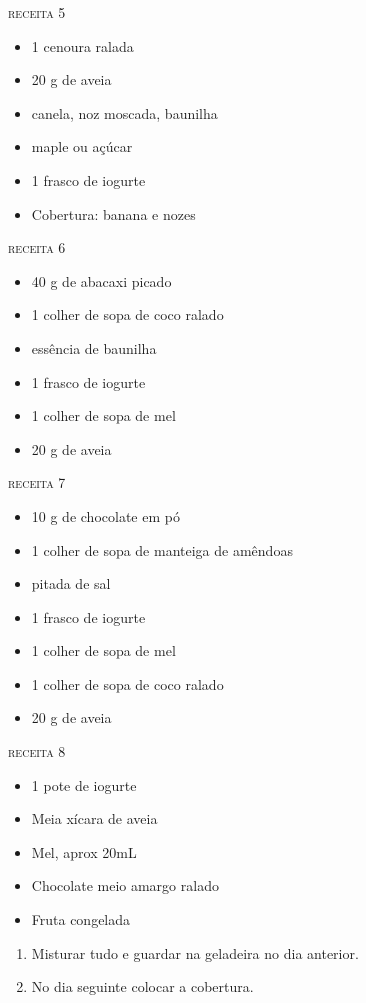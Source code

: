 {\begin{multicols}{2}
		\textsc{receita 5}
		\begin{itemize}
			\item 1 cenoura ralada
			\item 20 g de aveia
			\item canela, noz moscada, baunilha
			\item maple ou açúcar
			\item 1 frasco de iogurte
			\item Cobertura: banana e nozes
		\end{itemize}

		\textsc{receita 6}
		\begin{itemize}
			\item 40 g de abacaxi picado
			\item 1 colher de sopa de coco ralado
			\item essência de baunilha
			\item 1 frasco de iogurte
			\item 1 colher de sopa de mel
			\item 20 g de aveia
		\end{itemize}

		\textsc{receita 7}
		\begin{itemize}
			\item 10 g de chocolate em pó
			\item 1 colher de sopa de manteiga de amêndoas
			\item pitada de sal
			\item 1 frasco de iogurte
			\item 1 colher de sopa de mel
			\item 1 colher de sopa de coco ralado
			\item 20 g de aveia
		\end{itemize}

		\textsc{receita 8}
		\begin{itemize}
			\item 1 pote de iogurte
			\item Meia xícara de aveia
			\item Mel, aprox 20mL
			\item Chocolate meio amargo ralado
			\item Fruta congelada
		\end{itemize}

	\end{multicols}
} {\begin{enumerate}
		\item Misturar tudo e guardar na geladeira no dia anterior.
		\item No dia seguinte colocar a cobertura.
	\end{enumerate} }


